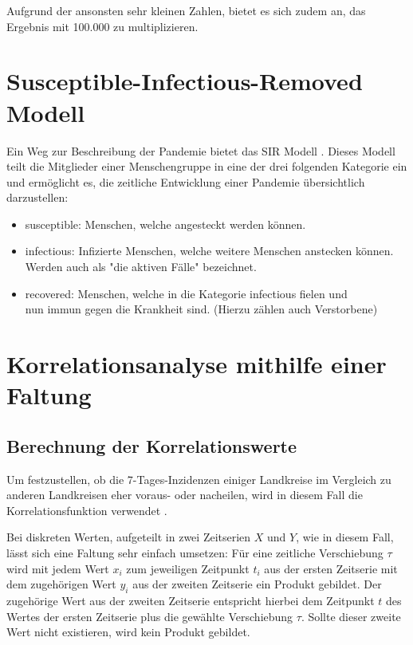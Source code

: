 Aufgrund der ansonsten sehr kleinen Zahlen, bietet es sich zudem an, das Ergebnis mit 100.000 zu multiplizieren.

\section{Susceptible-Infectious-Removed Modell}
Ein Weg zur Beschreibung der Pandemie bietet das SIR Modell \autocite{SIR}. Dieses Modell teilt die Mitglieder einer Menschengruppe in eine der drei folgenden Kategorie ein und ermöglicht es, die zeitliche Entwicklung einer Pandemie übersichtlich darzustellen:
\begin{itemize}
    \item \glqq{}susceptible\grqq{}: Menschen, welche angesteckt werden können.
    \item \glqq{}infectious\grqq{}: Infizierte Menschen, welche weitere Menschen anstecken können. Werden auch als "die aktiven Fälle" bezeichnet.
    \item \glqq{}recovered\grqq{}: Menschen, welche in die Kategorie \glqq{}infectious\grqq{} fielen und\\
    nun immun gegen die Krankheit sind. (Hierzu zählen auch Verstorbene)
\end{itemize}


\section{Korrelationsanalyse mithilfe einer Faltung}\label{sec:BeschreibungKorrelationsanalyse}
\subsection{Berechnung der Korrelationswerte}\label{Grundlagen:Berechnung der Korrelationwerte}
Um festzustellen, ob die 7-Tages-Inzidenzen einiger Landkreise im Vergleich zu anderen Landkreisen eher voraus- oder nacheilen, wird in diesem Fall die Korrelationsfunktion verwendet \autocite{Korrelation}.

Bei diskreten Werten, aufgeteilt in zwei Zeitserien $X$ und $Y$, wie in diesem Fall, lässt sich eine Faltung sehr einfach umsetzen:
Für eine zeitliche Verschiebung $\tau$ wird mit jedem Wert $x_i$ zum jeweiligen Zeitpunkt $t_i$ aus der ersten Zeitserie mit dem zugehörigen Wert $y_i$ aus der zweiten Zeitserie ein Produkt gebildet. Der zugehörige Wert aus der zweiten Zeitserie entspricht hierbei dem Zeitpunkt $t$ des Wertes der ersten Zeitserie plus die gewählte Verschiebung $\tau$. Sollte dieser zweite Wert nicht existieren, wird kein Produkt gebildet.

